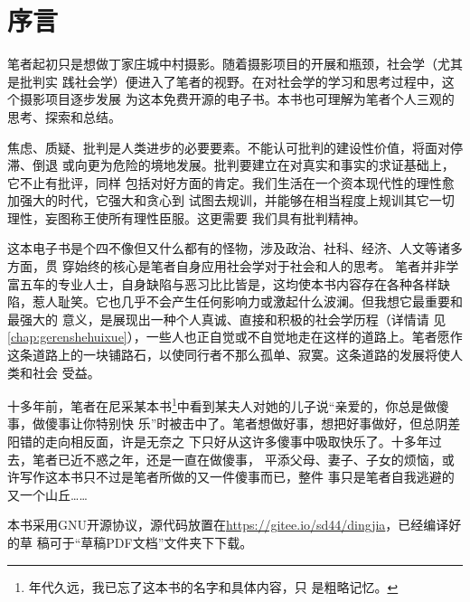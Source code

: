 \chapter{序言}
\label{chap:preface}

笔者起初只是想做丁家庄城中村摄影。随着摄影项目的开展和瓶颈，社会学（尤其是批判实
践社会学）便进入了笔者的视野。在对社会学的学习和思考过程中，这个摄影项目逐步发展
为这本免费开源的电子书。本书也可理解为笔者个人三观的思考、探索和总结。

焦虑、质疑、批判是人类进步的必要要素。不能认可批判的建设性价值，将面对停滞、倒退
或向更为危险的境地发展。批判要建立在对真实和事实的求证基础上，它不止有批评，同样
包括对好方面的肯定。我们生活在一个资本现代性的理性愈加强大的时代，它强大和贪心到
试图去规训，并能够在相当程度上规训其它一切理性，妄图称王使所有理性臣服。这更需要
我们具有批判精神。

这本电子书是个四不像但又什么都有的怪物，涉及政治、社科、经济、人文等诸多方面，贯
穿始终的核心是笔者自身应用社会学对于社会和人的思考。
笔者并非学富五车的专业人士，自身缺陷与恶习比比皆是，这均使本书内容存在各种各样缺
陷，惹人耻笑。它也几乎不会产生任何影响力或激起什么波澜。但我想它最重要和最强大的
意义，是展现出一种个人真诚、直接和积极的社会学历程（详情请
见\cref{chap:gerenshehuixue}），一些人也正自觉或不自觉地走在这样的道路上。笔者愿作
这条道路上的一块铺路石，以使同行者不那么孤单、寂寞。这条道路的发展将使人类和社会
受益。

十多年前，笔者在尼采某本书\footnote{年代久远，我已忘了这本书的名字和具体内容，只
  是粗略记忆。}中看到某夫人对她的儿子说“亲爱的，你总是做傻事，做傻事让你特别快
乐”时被击中了。笔者想做好事，想把好事做好，但总阴差阳错的走向相反面，许是无奈之
下只好从这许多傻事中吸取快乐了。十多年过去，笔者已近不惑之年，还是一直在做傻事，
平添父母、妻子、子女的烦恼，或许写作这本书只不过是笔者所做的又一件傻事而已，整件
事只是笔者自我逃避的又一个山丘……



本书采用GNU开源协议，源代码放置在\url{https://gitee.io/sd44/dingjia}，已经编译好的草
稿可于“草稿PDF文档”文件夹下下载。


